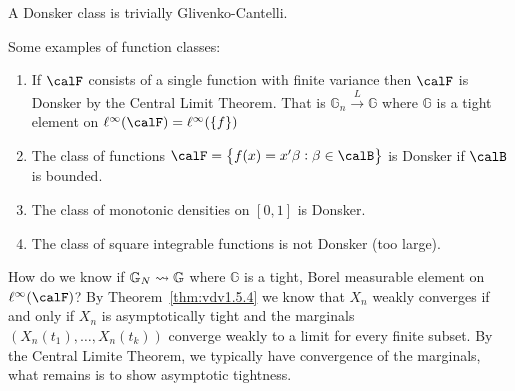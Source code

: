 A Donsker class is trivially Glivenko-Cantelli. 

\begin{example}
	Some examples of function classes:
	\begin{enumerate}
		\item If \(\calF\) consists of a single function with finite variance then \(\calF\) is Donsker by the Central Limit Theorem. That is  \(\mathbb{G}_n \overset{L}{\to}\mathbb{G}\) where \(\mathbb{G}\) is a tight element on \(\ell^\infty(\calF) = \ell^\infty(\{f\} )\) 
		\item The class of functions \(\calF = \left\{f(x) = x'\beta: \beta \in \calB\right\} \) is Donsker if \(\calB\) is bounded. 
		\item The class of monotonic densities on \([0,1]\) is Donsker. 
		\item The class of square integrable functions is not Donsker (too large).
	\end{enumerate}	
\end{example}

How do we know if \(\mathbb{G}_N \rightsquigarrow \mathbb{G}\) where \(\mathbb{G}\) is a tight, Borel measurable element on \(\ell^\infty(\calF)\)? By Theorem~\ref{thm:vdv1.5.4} we know that \(X_n\) weakly converges if and only if \(X_n\) is asymptotically tight and the marginals  \(\left(X_n(t_1),\dots,X_n(t_k)\right)\) converge weakly to a limit for every finite subset. By the Central Limite Theorem, we typically have convergence of the marginals, what remains is to show asymptotic tightness. 
